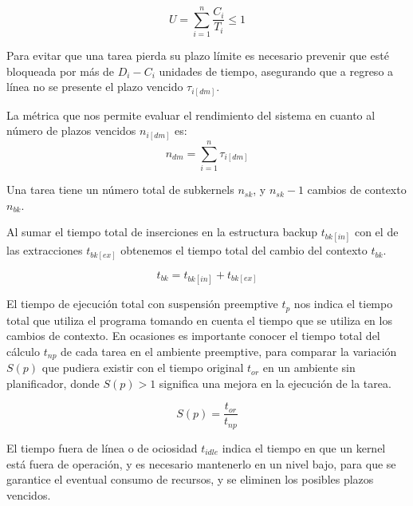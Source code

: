 \begin{equation}
U=\sum_{i=1}^{n} \frac{C_i}{T_i} \leq 1
\end{equation}

Para evitar que una tarea pierda su plazo límite es necesario prevenir que esté bloqueada por más de \textit{$D_i - C_i$} unidades de tiempo, asegurando que a regreso a línea no se presente el plazo vencido $\tau_{i[dm]}$.
\newline

La métrica que nos permite evaluar el rendimiento del sistema en cuanto al número de plazos vencidos \textit{$n_{i[dm]}$} es:
\begin{equation}
n_{dm}=\sum_{i=1}^{n} \tau_{i[dm]}
\end{equation}

Una tarea tiene un número total de subkernels \textit{$n_{sk}$}, y \textit{$n_{sk}-1$}  cambios de contexto \textit{$n_{bk}$}.
\newline

Al sumar el tiempo total de inserciones en la estructura backup \textit{$t_{bk[in]}$} con el de las extracciones \textit{$t_{bk[ex]}$} obtenemos el tiempo total del cambio del contexto \textit{$t_{bk}$}.

\begin{equation}
t_{bk}=t_{bk[in]}+t_{bk[ex]}
\end{equation}

El tiempo de ejecución total con suspensión preemptive \textit{$t_p$} nos indica el tiempo total que utiliza el programa tomando en cuenta el tiempo que se utiliza en los cambios de contexto. 
En ocasiones es importante conocer el tiempo total del cálculo \textit{$t_{np}$} de cada tarea en el ambiente preemptive, para comparar la variación \textit{$S(p)$} que pudiera existir con el tiempo original \textit{$t_{or}$} en un ambiente sin planificador, donde \textit{$S(p) > 1$} significa una mejora en la ejecución de la tarea.

\begin{equation}
S(p)=\frac{t_{or}}{t_{np}}
\end{equation}

El tiempo fuera de línea o de ociosidad \textit{$t_{idle}$} indica el tiempo en que un kernel está fuera de operación, y es necesario mantenerlo en un nivel bajo, para que se garantice el eventual consumo de recursos, y se eliminen los posibles plazos vencidos.
\newline